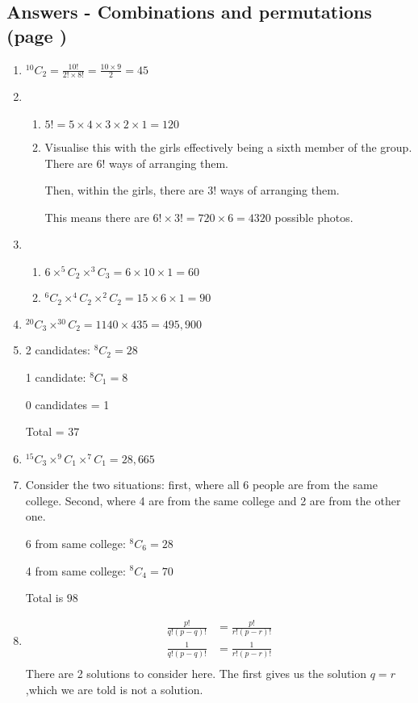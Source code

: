 \documentclass[../main.tex]{subfiles}
\begin{document}
\subsection*{Answers - Combinations and permutations (page \pageref{Combinations and permuations})}
\label{Combinations answers}
\begin{enumerate}
    \item
    \(^{10}C_2=\frac{10!}{2!\times 8!}=\frac{10\times 9}{2}=45\)
    \item 
        \begin{enumerate}
            \item 
            \(5!=5\times 4\times 3\times 2\times 1=120\)
            \item 
            Visualise this with the girls effectively being a sixth member of the group. There are \(6!\) ways of arranging them.

            Then, within the girls, there are \(3!\) ways of arranging them.

            This means there are \(6! \times 3!=720\times 6=4320\) possible photos.
        \end{enumerate}
    \item 
        \begin{enumerate}
            \item 
            \(6\times ^5C_2 \times ^3C_3 =6\times 10\times 1=60\)
            \item 
            \(^6C_2 \times ^4C_2 \times ^2C_2 = 15\times 6\times 1=90\)
        \end{enumerate}
    \item 
    \( ^{20}C_3\times ^{30}C_2 = 1140\times 435=495,900 \)
    \item 
    2 candidates: \(^8C_2 = 28\)

    1 candidate: \(^8C_1 = 8\)

    0 candidates  = 1

    Total = \(37\)
    \item 
    \(^{15}C_3 \times ^9C_1 \times ^7C_1 = 28,665\)
    \item 
    Consider the two situations: first, where all 6 people are from the same college. Second, where 4 are from the same college and 2 are from the other one.

    6 from same college: \(^8C_6=28\)

    4 from same college: \(^8C_4=70\)

    Total is \(98\)
    \item 
    \begin{align*}
        \frac{p!}{q!(p-q)!}
        &=\frac{p!}{r!(p-r)!}\\
        \frac{1}{q!(p-q)!}
        &=\frac{1}{r!(p-r)!}\\
    \end{align*}
    There are 2 solutions to consider here. The first gives us the solution \(q=r \),which we are told is not a solution.


\end{enumerate}
\end{document}
